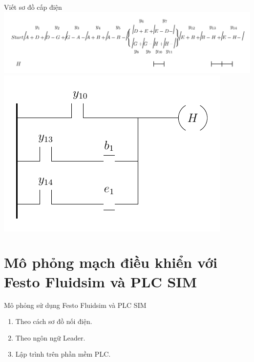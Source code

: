 \documentclass[24pt]{beamer}
\begin{document}
\begin{frame}[plain]{Viết sơ đồ cấp điện}
		\vspace{-0.5cm}
		\hspace{-1cm}\includegraphics[scale=0.7]{draw-tikz/quatrinh-bt4-buoc3-sodocapdien-H-b1.pdf}\\
		\vspace{-.5cm}
		\includegraphics[scale=1]{draw-tikz/quatrinh-bt4-buoc3-sodocapdien-H-b2.pdf}
\end{frame}
\section[Mô phỏng mạch điều khiển]{Mô phỏng mạch điều khiển với Festo Fluidsim và PLC SIM}
\begin{frame}{Mô phỏng sử dụng Festo Fluidsim và PLC SIM}
	\begin{enumerate}
		\justifying
		\item Theo cách sơ đồ nối điện.
		
		\item Theo ngôn ngữ Leader.
		
		\item Lập trình trên phần mềm PLC.
	\end{enumerate}
\end{frame}
\end{document}
